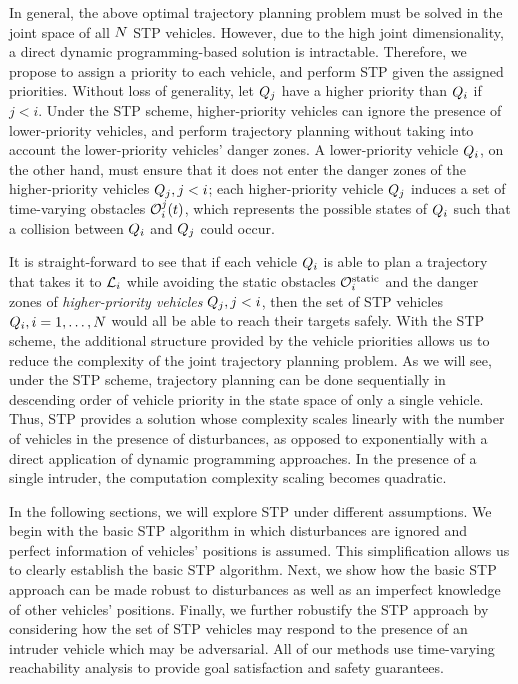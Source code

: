 In general, the above optimal trajectory planning problem must be solved in the joint space of all $N$ STP vehicles. However, due to the high joint dimensionality, a direct dynamic programming-based solution is intractable. Therefore, we propose to assign a priority to each vehicle, and perform STP given the assigned priorities. Without loss of generality, let $Q_j$ have a higher priority than $Q_i$ if $j<i$. Under the STP scheme, higher-priority vehicles can ignore the presence of lower-priority vehicles, and perform trajectory planning without taking into account the lower-priority vehicles' danger zones. A lower-priority vehicle $Q_i$, on the other hand, must ensure that it does not enter the danger zones of the higher-priority vehicles $Q_j, j<i$; each higher-priority vehicle $Q_j$ induces a set of time-varying obstacles $\mathcal{O}_i^j(t)$, which represents the possible states of $Q_i$ such that a collision between $Q_i$ and $Q_j$ could occur.

It is straight-forward to see that if each vehicle $Q_i$ is able to plan a trajectory that takes it to $\mathcal{L}_i$ while avoiding the static obstacles $\mathcal{O}^\text{static}_i$ and the danger zones of \textit{higher-priority vehicles} $Q_j, j<i$, then the set of STP vehicles $Q_i, i=1,\ldots,N$ would all be able to reach their targets safely. With the STP scheme, the additional structure provided by the vehicle priorities allows us to reduce the complexity of the joint trajectory planning problem. As we will see, under the STP scheme, trajectory planning can be done sequentially in descending order of vehicle priority in the state space of only a single vehicle. Thus, STP provides a solution whose complexity scales linearly with the number of vehicles in the presence of disturbances, as opposed to exponentially with a direct application of dynamic programming approaches. In the presence of a single intruder, the computation complexity scaling becomes quadratic.

In the following sections, we will explore STP under different assumptions. We begin with the basic STP algorithm in which disturbances are ignored and perfect information of vehicles' positions is assumed. This simplification allows us to clearly establish the basic STP algorithm. Next, we show how the basic STP approach can be made robust to disturbances as well as an imperfect knowledge of other vehicles' positions. Finally, we further robustify the STP approach by considering how the set of STP vehicles may respond to the presence of an intruder vehicle which may be adversarial. All of our methods use time-varying reachability analysis to provide goal satisfaction and safety guarantees.